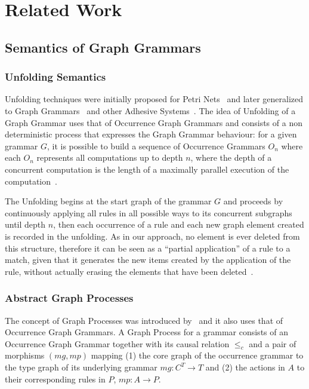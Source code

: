 \chapter{Related Work}\label{ch:related-work}

\section{Semantics of Graph Grammars}

\subsection{Unfolding Semantics}

  Unfolding techniques were initially proposed for Petri Nets~\cite{Nielsen1981} and later generalized to Graph Grammars~\cite{Ribeiro1996} and other Adhesive Systems~\cite{Baldan2009}.
  The idea of Unfolding of a Graph Grammar uses that of Occurrence Graph Grammars and consists of a non deterministic process that expresses the Graph Grammar behaviour: for a given grammar $G$, it is possible to build a sequence of Occurrence Grammars $O_n$ where each $O_n$ represents all computations up to depth $n$, where the depth of a concurrent computation is the length of a maximally parallel execution of the computation~\cite{Baldan2009}.

  The Unfolding begins at the start graph of the grammar $G$ and proceeds by continuously applying all rules in all possible ways to its concurrent subgraphs until depth $n$, then each occurrence of a rule and each new graph element created is recorded in the unfolding.
  As in our approach, no element is ever deleted from this structure, therefore it can be seen as a ``partial application'' of a rule to a match, given that it generates the new items created by the application of the rule, without actually erasing the elements that have been deleted~\cite{Baldan2008}.%

\subsection{Abstract Graph Processes}

The concept of Graph Processes was introduced by~\cite{Corradini1996} and it also uses that of Occurrence Graph Grammars. A Graph Process for a grammar \graphGrammar{} consists of an Occurrence Graph Grammar \occurrenceGrammar{} together with its causal relation $\leq_c$ and a pair of morphisms $(mg,mp)$ mapping (1) the core graph of the occurrence grammar to the type graph of its underlying grammar $mg: C^T \rightarrow T$ and (2) the actions in $A$ to their corresponding rules in $P$, $mp: A
\rightarrow P$.

